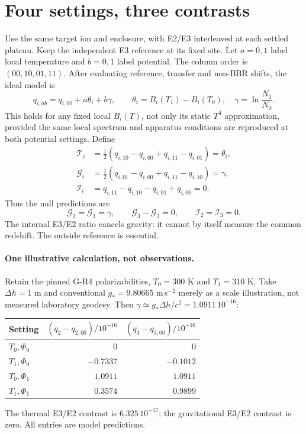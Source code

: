 \documentclass[11pt,a4paper]{article}
\begin{document}
\newpage
\section{Four settings, three contrasts}
Use the same target ion and enclosure, with E2/E3 interleaved at each
settled plateau. Keep the independent E3 reference at its fixed site.
Let $a=0,1$ label local temperature and $b=0,1$ label potential.
The column order is $(00,10,01,11)$. After evaluating reference,
transfer and non-BBR shifts, the ideal model is
\begin{equation}\label{eq:separable}
 q_{i,ab}=q_{i,00}+a\theta_i+b\gamma,\qquad
 \theta_i=B_i(T_1)-B_i(T_0),\quad
 \gamma=\ln\frac{N_1}{N_0}.
\end{equation}
This holds for any fixed local $B_i(T)$, not only its static $T^4$
approximation, provided the same local spectrum and apparatus
conditions are reproduced at both potential settings.
Define
\begin{align}
 \mathcal T_i&=\tfrac12(q_{i,10}-q_{i,00}+q_{i,11}-q_{i,01})
                =\theta_i,\\
 \mathcal G_i&=\tfrac12(q_{i,01}-q_{i,00}+q_{i,11}-q_{i,10})
                =\gamma,\\
 \mathcal I_i&=q_{i,11}-q_{i,10}-q_{i,01}+q_{i,00}=0.
\end{align}
Thus the null predictions are
\begin{equation}\label{eq:null}
 \mathcal G_2=\mathcal G_3=\gamma,\qquad
 \mathcal G_3-\mathcal G_2=0,\qquad \mathcal I_2=\mathcal I_3=0.
\end{equation}
The internal E3/E2 ratio cancels gravity: it cannot by itself measure
the common redshift. The outside reference is essential.

\paragraph{One illustrative calculation, not observations.}
Retain the pinned G-R4 polarizabilities, $T_0=300$ K and $T_1=310$ K.
Take $\Delta h=1$ m and conventional $g_*=9.80665$ m\,s$^{-2}$ merely
as a scale illustration, not measured laboratory geodesy. Then
$\gamma\simeq g_*\Delta h/c^2=1.0911\,10^{-16}$:
\begin{center}
\begin{tabular}{lrr}
\toprule
Setting & $(q_2-q_{2,00})/10^{-16}$ & $(q_3-q_{3,00})/10^{-16}$\\
\midrule
$T_0,\Phi_0$ & $0$ & $0$\\
$T_1,\Phi_0$ & $-0.7337$ & $-0.1012$\\
$T_0,\Phi_1$ & $1.0911$ & $1.0911$\\
$T_1,\Phi_1$ & $0.3574$ & $0.9899$\\
\bottomrule
\end{tabular}
\end{center}
The thermal E3/E2 contrast is $6.325\,10^{-17}$; the gravitational
E3/E2 contrast is zero. All entries are model predictions.
\end{document}
